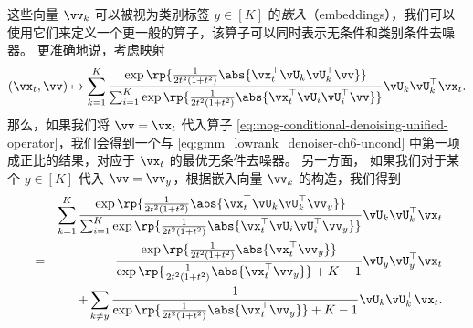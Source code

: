 \documentclass[../../book-main_zh.tex]{subfiles}
\begin{document}
\begin{example}
    这些向量 $\vv_k$ 可以被视为类别标签 $y \in [K]$ 的\textit{嵌入}（embeddings），我们可以使用它们来定义一个更一般的算子，该算子可以同时表示无条件和类别条件去噪器。
    更准确地说，考虑映射
    \begin{equation}\label{eq:mog-conditional-denoising-unified-operator}
        (\vx_t, \vv) \mapsto
        \sum_{k = 1}^{K}\frac{
            \exp\rp{\frac{1}{2t^{2}(1
            + t^{2})} \abs{\vx_t^\top \vU_k \vU_k^\top \vv}}
        }
        {
            \sum_{i
            = 1}^{K}\exp\rp{\frac{1}{2t^{2}(1
            + t^{2})}\abs{\vx_t^\top \vU_i \vU_i^\top \vv}}
        }
        \vU_{k}\vU_{k}^{\top}\vx_t.
    \end{equation}
    那么，如果我们将 $\vv = \vx_t$ 代入算子
    \eqref{eq:mog-conditional-denoising-unified-operator}，我们会得到一个与
    \eqref{eq:gmm_lowrank_denoiser-ch6-uncond} 中第一项成正比的结果，对应于 $\vx_t$ 的最优无条件去噪器。
    另一方面，
    如果我们对于某个 $y \in [K]$ 代入 $\vv = \vv_y$，根据嵌入向量 $\vv_k$ 的构造，我们得到
    \begin{eqnarray}
        &&\sum_{k = 1}^{K}
        \frac{
            \exp\rp{\frac{1}{2t^{2}(1
            + t^{2})}\abs{\vx_t^\top \vU_k \vU_k^\top \vv_y}}
        }
        {
            \sum_{i
            = 1}^{K}\exp\rp{\frac{1}{2t^{2}(1
            + t^{2})}\abs{\vx_t^\top \vU_i \vU_i^\top \vv_y}}
        }
        \vU_{k}\vU_{k}^{\top}\vx_t \nonumber \\
        &=&
        \frac{
            \exp\rp{\frac{1}{2t^{2}(1
            + t^{2})}\abs{\vx_t^\top \vv_y}}
        }
        {
            \exp\rp{\frac{1}{2t^{2}(1
            + t^{2})}\abs{\vx_t^\top \vv_y}}
            + K-1
        }
        \vU_{y}\vU_{y}^{\top}\vx_t
        \\
        && +
        \sum_{k \neq y}
        \frac{
            1
        }
        {
            \exp\rp{\frac{1}{2t^{2}(1
            + t^{2})}\abs{\vx_t^\top \vv_y}}
            + K-1
        }
        \vU_{k}\vU_{k}^{\top}\vx_t.
    \end{eqnarray}


\end{example}
\end{document}
